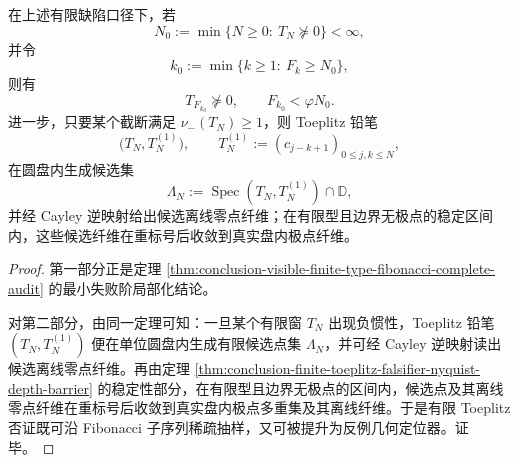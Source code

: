 \begin{theorem}\label{thm:conclusion-toeplitz-falsifier-fibonacci-localization}
在上述有限缺陷口径下，若
\[
N_0:=\min\{N\ge 0:\ T_N\nsucceq 0\}<\infty,
\]
并令
\[
k_0:=\min\{k\ge 1:\ F_k\ge N_0\},
\]
则有
\[
T_{F_{k_0}}\nsucceq 0,
\qquad
F_{k_0}<\varphi N_0.
\]
进一步，只要某个截断满足 \(\nu_-(T_N)\ge 1\)，则 Toeplitz 铅笔
\[
\bigl(T_N,T_N^{(1)}\bigr),
\qquad
T_N^{(1)}:=(c_{j-k+1})_{0\le j,k\le N},
\]
在圆盘内生成候选集
\[
\Lambda_N:=\operatorname{Spec}(T_N,T_N^{(1)})\cap\mathbb D,
\]
并经 Cayley 逆映射给出候选离线零点纤维；在有限型且边界无极点的稳定区间内，这些候选纤维在重标号后收敛到真实盘内极点纤维。
\end{theorem}
\begin{proof}
第一部分正是定理 \ref{thm:conclusion-visible-finite-type-fibonacci-complete-audit} 的最小失败阶局部化结论。

对第二部分，由同一定理可知：一旦某个有限窗 \(T_N\) 出现负惯性，Toeplitz 铅笔 \((T_N,T_N^{(1)})\) 便在单位圆盘内生成有限候选点集 \(\Lambda_N\)，并可经 Cayley 逆映射读出候选离线零点纤维。再由定理 \ref{thm:conclusion-finite-toeplitz-falsifier-nyquist-depth-barrier} 的稳定性部分，在有限型且边界无极点的区间内，候选点及其离线零点纤维在重标号后收敛到真实盘内极点多重集及其离线纤维。于是有限 Toeplitz 否证既可沿 Fibonacci 子序列稀疏抽样，又可被提升为反例几何定位器。证毕。
\end{proof}


